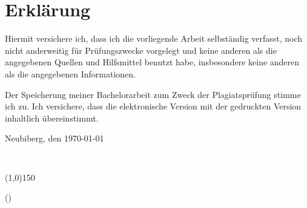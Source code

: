 \cleardoublepage
\pagestyle{empty}
\thispagestyle{empty}
\section*{Erklärung}
Hiermit versichere ich, dass ich die vorliegende Arbeit selbständig verfasst, noch nicht anderweitig für Prüfungszwecke vorgelegt und keine anderen als die angegebenen Quellen und Hilfsmittel benutzt habe, insbesondere keine anderen als die angegebenen Informationen.

Der Speicherung meiner Bachelorarbeit zum Zweck der Plagiatsprüfung stimme ich zu. Ich versichere, dass die elektronische Version mit der gedruckten Version inhaltlich übereinstimmt.

\vspace{2cm}
\begin{flushright}
	
	Neubiberg, den \today
	\begin{verbatim}
	
	\end{verbatim}
	\line(1,0){150}
	
	(\thesisAuthor)
\end{flushright}
\cleardoublepage
\baselineskip5mm

